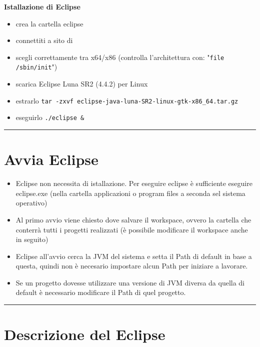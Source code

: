 \documentclass{article}
\begin{document}
\textbf{Istallazione di Eclipse}
\begin{itemize}
\item crea la cartella eclipse
\item connettiti a sito di \href{https://eclipse.org/downloads/}{}
\item scegli correttamente tra x64/x86 (controlla l'architettura con:
  "\texttt{file /sbin/init}")
\item scarica Eclipse Luna SR2 (4.4.2) per Linux
\item estrarlo  \texttt{tar -zxvf eclipse-java-luna-SR2-linux-gtk-x86\_64.tar.gz}
\item eseguirlo \texttt{./eclipse \&}
\end{itemize}


\hrule
\section{Avvia Eclipse}
\begin{itemize}
\item Eclipse non necessita di istallazione. Per eseguire eclipse \` e sufficiente eseguire eclipse.exe (nella cartella applicazioni o program files a seconda sel sistema operativo)
\item Al primo avvio viene chiesto dove salvare il workspace, ovvero la cartella  che conterr\` a tutti i progetti realizzati (\`e possibile modificare il workspace anche in seguito)
\end{itemize}

\begin{itemize}
\item Eclipse all'avvio cerca la JVM del sistema  e setta il Path di default in base a  questa, quindi non \`e necesario  impostare alcun Path per iniziare a  lavorare.
\item Se un progetto dovesse utilizzare una versione di JVM diversa da quella di  default \`e necessario modificare il Path di quel progetto.
\end{itemize}
\hrule
\section{Descrizione del Eclipse}
\end{document}
